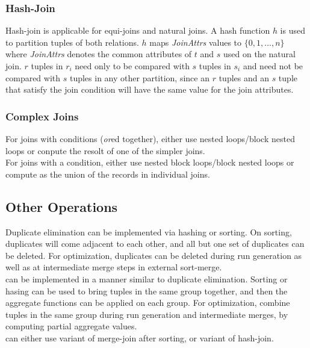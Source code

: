\documentclass{article}
\begin{document}
\subsubsection{Hash-Join}

Hash-join is applicable for equi-joins and natural joins. A hash function $h$ is used to partition tuples of both relations. $h$ maps \emph{JoinAttrs} values to $\{0, 1, \dots , n\}$ where \emph{JoinAttrs} denotes the common attributes of $t$ and $s$ used on the natural join. $r$ tuples in $r_i$ need only to be compared with $s$ tuples in $s_i$ and need not be compared with $s$ tuples in any other partition, since an $r$ tuples and an $s$ tuple that satisfy the join condition will have the same value for the join attributes. 

\subsubsection{Complex Joins}

For joins with  conditions (\emph{or}ed together), either use nested loops/block nested loops or conpute the resolt of one of the simpler joins. \\ 

For joins with a  condition, either use nested block loops/block nested loops or compute as the union of the records in individual joins. \\ 

\subsection{Other Operations}

Duplicate elimination can be implemented via hashing or sorting. On sorting, duplicates will come adjacent to each other, and all but one set of duplicates can be deleted. For optimization, duplicates can be deleted during run generation as well as at intermediate merge steps in external sort-merge. \\ 

 can be implemented in a manner similar to duplicate elimination. Sorting or hasing can be used to bring tuples in the same group together, and then the aggregate functions can be applied on each group. For optimization, combine tuples in the same group during run generation and intermediate merges, by computing partial aggregate values. \\ 

 can either use variant of merge-join after sorting, or variant of hash-join. \\ 
\end{document}
